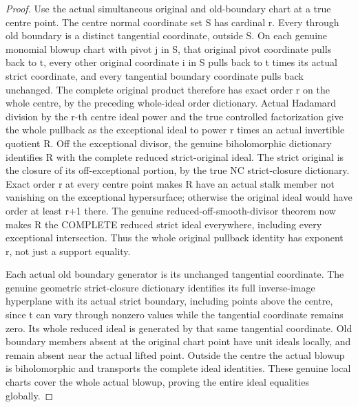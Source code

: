 \begin{proof}
Use the actual simultaneous original and old-boundary chart at a true centre
point. The centre normal coordinate set S has cardinal r. Every through old
boundary is a distinct tangential coordinate, outside S. On each genuine
monomial blowup chart with pivot j in S, that original pivot coordinate pulls
back to t, every other original coordinate i in S pulls back to t times its
actual strict coordinate, and every tangential boundary coordinate pulls back
unchanged. The complete original product therefore has exact order r on the
whole centre, by the preceding whole-ideal order dictionary. Actual Hadamard
division by the r-th centre ideal power and the true controlled factorization
give the whole pullback as the exceptional ideal to power r times an actual
invertible quotient R. Off the exceptional divisor, the genuine biholomorphic
dictionary identifies R with the complete reduced strict-original ideal.
The strict original is the closure of its off-exceptional portion, by the true
NC strict-closure dictionary. Exact order r at every centre point makes R have
an actual stalk member not vanishing on the exceptional hypersurface; otherwise
the original ideal would have order at least r+1 there. The genuine
reduced-off-smooth-divisor theorem now makes R the COMPLETE reduced strict
ideal everywhere, including every exceptional intersection. Thus the whole
original pullback identity has exponent r, not just a support equality.

Each actual old boundary generator
is its unchanged tangential coordinate. The genuine geometric strict-closure
dictionary identifies its full inverse-image hyperplane with its actual strict
boundary, including points above the centre, since t can vary through nonzero
values while the tangential coordinate remains zero. Its whole reduced ideal
is generated by that same tangential coordinate. Old boundary members absent
at the original chart point have unit ideals locally, and remain absent near
the actual lifted point. Outside the centre the actual blowup is biholomorphic
and transports the complete ideal identities. These genuine local charts cover
the whole actual blowup, proving the entire ideal equalities globally.
\end{proof}

